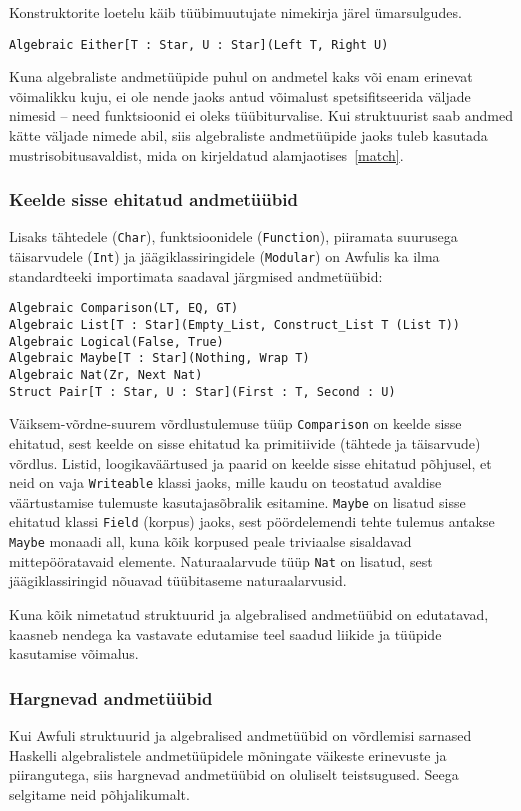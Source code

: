 \documentclass[12pt]{article}
\begin{document}
        Konstruktorite loetelu käib tüübimuutujate nimekirja järel ümarsulgudes.

        \begin{verbatim}Algebraic Either[T : Star, U : Star](Left T, Right U)\end{verbatim}

        Kuna algebraliste andmetüüpide puhul on andmetel kaks või enam erinevat võimalikku kuju, ei ole nende jaoks antud võimalust spetsifitseerida väljade nimesid -- need funktsioonid ei oleks tüübiturvalise. Kui struktuurist saab andmed kätte väljade nimede abil, siis algebraliste andmetüüpide jaoks tuleb kasutada mustrisobitusavaldist, mida on kirjeldatud alamjaotises~\ref{match}.
      \subsubsection{Keelde sisse ehitatud andmetüübid}
        Lisaks tähtedele (\verb!Char!), funktsioonidele (\verb!Function!), piiramata suurusega täisarvudele (\verb!Int!) ja jäägiklassiringidele (\verb!Modular!) on Awfulis ka ilma standardteeki importimata saadaval järgmised andmetüübid:

        \begin{verbatim}Algebraic Comparison(LT, EQ, GT)
Algebraic List[T : Star](Empty_List, Construct_List T (List T))
Algebraic Logical(False, True)
Algebraic Maybe[T : Star](Nothing, Wrap T)
Algebraic Nat(Zr, Next Nat)
Struct Pair[T : Star, U : Star](First : T, Second : U)\end{verbatim}

        Väiksem-võrdne-suurem võrdlustulemuse tüüp \verb!Comparison! on keelde sisse ehitatud, sest keelde on sisse ehitatud ka primitiivide (tähtede ja täisarvude) võrdlus. Listid, loogikaväärtused ja paarid on keelde sisse ehitatud põhjusel, et neid on vaja \verb!Writeable! klassi jaoks, mille kaudu on teostatud avaldise väärtustamise tulemuste kasutajasõbralik esitamine. \verb!Maybe! on lisatud sisse ehitatud klassi \verb!Field! (korpus) jaoks, sest pöördelemendi tehte tulemus antakse \verb!Maybe! monaadi all, kuna kõik korpused peale triviaalse sisaldavad mittepööratavaid elemente. Naturaalarvude tüüp \verb!Nat! on lisatud, sest jäägiklassiringid nõuavad tüübitaseme naturaalarvusid.

        Kuna kõik nimetatud struktuurid ja algebralised andmetüübid on edutatavad, kaasneb nendega ka vastavate edutamise teel saadud liikide ja tüüpide kasutamise võimalus.
      \subsubsection{Hargnevad andmetüübid}\label{hargnevad}
        Kui Awfuli struktuurid ja algebralised andmetüübid on võrdlemisi sarnased Haskelli algebralistele andmetüüpidele mõningate väikeste erinevuste ja piirangutega, siis hargnevad andmetüübid on oluliselt teistsugused. Seega selgitame neid põhjalikumalt.
\end{document}
